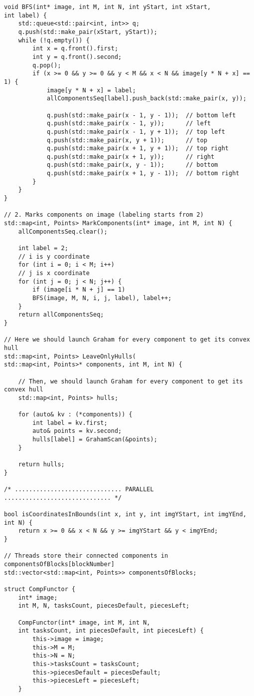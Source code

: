 \documentclass[14pt, russian]{extarticle}
\begin{document}
\begin{lstlisting}
void BFS(int* image, int M, int N, int yStart, int xStart,
int label) {
	std::queue<std::pair<int, int>> q;
	q.push(std::make_pair(xStart, yStart));
	while (!q.empty()) {
		int x = q.front().first;
		int y = q.front().second;
		q.pop();
		if (x >= 0 && y >= 0 && y < M && x < N && image[y * N + x] == 1) {
			image[y * N + x] = label;
			allComponentsSeq[label].push_back(std::make_pair(x, y));
			
			q.push(std::make_pair(x - 1, y - 1));  // bottom left
			q.push(std::make_pair(x - 1, y));      // left
			q.push(std::make_pair(x - 1, y + 1));  // top left
			q.push(std::make_pair(x, y + 1));      // top
			q.push(std::make_pair(x + 1, y + 1));  // top right
			q.push(std::make_pair(x + 1, y));      // right
			q.push(std::make_pair(x, y - 1));      // bottom
			q.push(std::make_pair(x + 1, y - 1));  // bottom right
		}
	}
}

// 2. Marks components on image (labeling starts from 2)
std::map<int, Points> MarkComponents(int* image, int M, int N) {
	allComponentsSeq.clear();
	
	int label = 2;
	// i is y coordinate
	for (int i = 0; i < M; i++)
	// j is x coordinate
	for (int j = 0; j < N; j++) {
		if (image[i * N + j] == 1)
		BFS(image, M, N, i, j, label), label++;
	}
	return allComponentsSeq;
}

// Here we should launch Graham for every component to get its convex hull
std::map<int, Points> LeaveOnlyHulls(
std::map<int, Points>* components, int M, int N) {
	
	// Then, we should launch Graham for every component to get its convex hull
	std::map<int, Points> hulls;
	
	for (auto& kv : (*components)) {
		int label = kv.first;
		auto& points = kv.second;
		hulls[label] = GrahamScan(&points);
	}
	
	return hulls;
}

/* .............................. PARALLEL .............................. */

bool isCoordinatesInBounds(int x, int y, int imgYStart, int imgYEnd, int N) {
	return x >= 0 && x < N && y >= imgYStart && y < imgYEnd;
}

// Threads store their connected components in componentsOfBlocks[blockNumber]
std::vector<std::map<int, Points>> componentsOfBlocks;

struct CompFunctor {
	int* image;
	int M, N, tasksCount, piecesDefault, piecesLeft;
	
	CompFunctor(int* image, int M, int N,
	int tasksCount, int piecesDefault, int piecesLeft) {
		this->image = image;
		this->M = M;
		this->N = N;
		this->tasksCount = tasksCount;
		this->piecesDefault = piecesDefault;
		this->piecesLeft = piecesLeft;
	}
	

\end{lstlisting}
\end{document}
